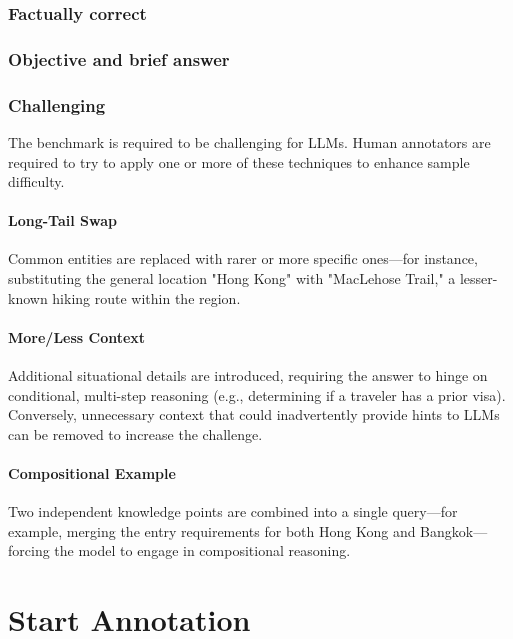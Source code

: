 \documentclass[11pt]{article}
\begin{document}
\subsubsection{Factually correct}

\subsubsection{Objective and brief answer}

\subsubsection{Challenging}

The benchmark is required to be challenging for LLMs. Human annotators are required to try to apply one or more of these techniques to enhance sample difficulty.

\paragraph{Long-Tail Swap}
Common entities are replaced with rarer or more specific ones—for instance, substituting the general location "Hong Kong" with "MacLehose Trail," a lesser-known hiking route within the region.

\paragraph{More/Less Context}
Additional situational details are introduced, requiring the answer to hinge on conditional, multi-step reasoning (e.g., determining if a traveler has a prior visa). Conversely, unnecessary context that could inadvertently provide hints to LLMs can be removed to increase the challenge.

\paragraph{Compositional Example}
Two independent knowledge points are combined into a single query—for example, merging the entry requirements for both Hong Kong and Bangkok—forcing the model to engage in compositional reasoning.

\section{Start Annotation}

\end{document}
